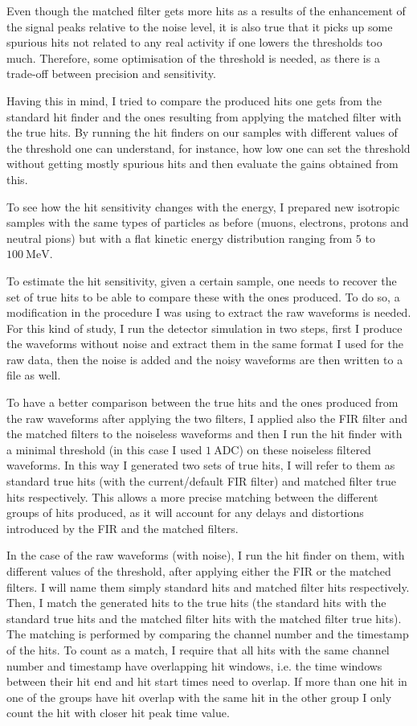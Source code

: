 Even though the matched filter gets more hits as a results of the enhancement of the signal peaks relative to the noise level, it is also true that it picks up some spurious hits not related to any real activity if one lowers the thresholds too much. Therefore, some optimisation of the threshold is needed, as there is a trade-off between precision and sensitivity.

Having this in mind, I tried to compare the produced hits one gets from the standard hit finder and the ones resulting from applying the matched filter with the true hits. By running the hit finders on our samples with different values of the threshold one can understand, for instance, how low one can set the threshold without getting mostly spurious hits and then evaluate the gains obtained from this.

To see how the hit sensitivity changes with the energy, I prepared new isotropic samples with the same types of particles as before (muons, electrons, protons and neutral pions) but with a flat kinetic energy distribution ranging from $5$ to $100 \ \mathrm{MeV}$.

To estimate the hit sensitivity, given a certain sample, one needs to recover the set of true hits to be able to compare these with the ones produced. To do so, a modification in the procedure I was using to extract the raw waveforms is needed. For this kind of study, I run the detector simulation in two steps, first I produce the waveforms without noise and extract them in the same format I used for the raw data, then the noise is added and the noisy waveforms are then written to a file as well.

To have a better comparison between the true hits and the ones produced from the raw waveforms after applying the two filters, I applied also the FIR filter and the matched filters to the noiseless waveforms and then I run the hit finder with a minimal threshold (in this case I used $1 \ \mathrm{ADC}$) on these noiseless filtered waveforms. In this way I generated two sets of true hits, I will refer to them as standard true hits (with the current/default FIR filter) and matched filter true hits respectively. This allows a more precise matching between the different groups of hits produced, as it will account for any delays and distortions introduced by the FIR and the matched filters.

In the case of the raw waveforms (with noise), I run the hit finder on them, with different values of the threshold, after applying either the FIR or the matched filters. I will name them simply standard hits and matched filter hits respectively. Then, I match the generated hits to the true hits (the standard hits with the standard true hits and the matched filter hits with the matched filter true hits). The matching is performed by comparing the channel number and the timestamp of the hits. To count as a match, I require that all hits with the same channel number and timestamp have overlapping hit windows, i.e. the time windows between their hit end and hit start times need to overlap. If more than one hit in one of the groups have hit overlap with the same hit in the other group I only count the hit with closer hit peak time value.


